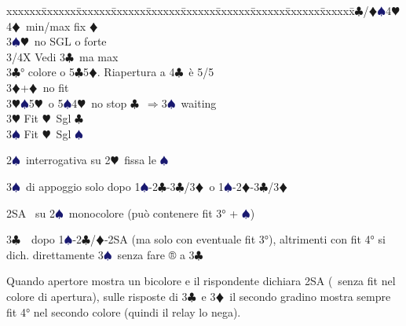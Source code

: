 \documentclass[a4paper,italian]{article}
\newcommand{\BC}{\textcolor{OliveGreen}{$\clubsuit$}}
\newcommand{\BD}{\textcolor{RedOrange}{$\vardiamondsuit$}}
\newcommand{\BH}{\textcolor{Red2}{$\varheartsuit${}}}
\newcommand{\BS}{\textcolor{MidnightBlue}{$\spadesuit${}}}
\newenvironment{bidtable}
{\begin{tabbing}

    xxxxxx\=xxxxxx\=xxxxxx\=xxxxxx\=xxxxxx\=xxxxxx\=xxxxxx\=xxxxxx\=xxxxxx\=xxxxxx\=\kill}
{\end{tabbing} }%
\newenvironment{varie}[1]
{\begin{tcolorbox}[colframe=green!40!black,title=#1]}
    {
\end{tcolorbox} }%
\begin{document}
\begin{multicols}{2}
\begin{bidtable}
        4\BC/\BD {}\BS 4\BH 4\BD\ min/max fix \BD \-\\
        3\BS {}\BH\ no SGL o forte\-\\
        3/4X \> Vedi 3\BC\ ma max\-\\
        3\BC {}° colore o 5\BC 5\BD . Riapertura a 4\BC\ è 5/5\\
        3\BD {}+\BD\ no fit\+\\
        3\BH {}\BS5\BH\ o 5\BS4\BH\ no stop \BC\ $\Rightarrow$3\BS\ waiting\-\\
        3\BH \> Fit \BH\ Sgl \BC\\
        3\BS \> Fit \BH\ Sgl \BS\-\\
    \end{bidtable}
    \begin{varie}{Riepilogo mnemonico per i fissaggi}
        2\BS\ interrogativa su 2\BH\ fissa le \BS

        3\BS\ di appoggio solo dopo 1\BS-2\BC-3\BC/3\BD\ o 1\BS-2\BD-3\BC/3\BD

        2SA \textregistered\ su 2\BS\ monocolore  (può contenere fit 3° + \BS )

        3\BC\ \textregistered\ dopo 1\BS-2\BC/\BD-2SA (ma solo con eventuale fit 3°), altrimenti con fit 4° si dich.
        direttamente 3\BS\ senza fare ® a 3\BC

        Quando apertore mostra un bicolore e il rispondente dichiara 2SA (\textregistered\ senza fit nel colore di apertura), sulle risposte di 3\BC\ e 3\BD\ il secondo gradino mostra sempre fit 4° nel secondo colore (quindi il relay lo nega).


\end{varie}
\end{multicols}
\end{document}
